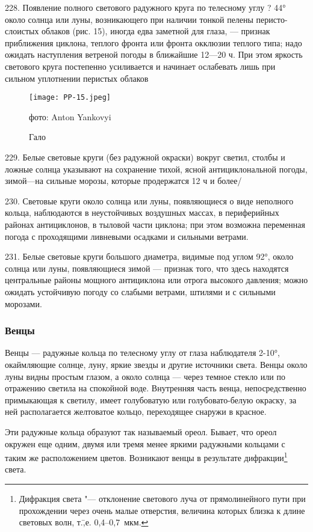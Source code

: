 228. Появление полного светового радужного круга по телесному углу ? 44° около солнца или луны, возникающего при наличии тонкой пелены перисто-слоистых облаков (рис. 15), иногда едва заметной для глаза, — признак приближения циклона, теплого фронта или фронта окклюзии теплого типа; надо ожидать наступления ветреной погоды в ближайшие 12—20 ч. При этом яркость светового круга постепенно усиливается и начинает ослабевать лишь при сильном уплотнении перистых облаков

\begin{figure}[htb]
  \centering{}
  \texttt{[image: PP-15.jpeg]}
  \caption{Гало}
  \label{fig:pp15}
  \small
  \centering{}фото: Anton Yankovyi
\end{figure}

229. Белые световые круги (без радужной окраски) вокруг светил, столбы и ложные солнца указывают на сохранение тихой, ясной антициклональной погоды, зимой—на сильные морозы, которые продержатся 12 ч и более/

230. Световые круги около солнца или луны, появляющиеся о виде неполного кольца, наблюдаются в неустойчивых воздушных массах, в периферийных районах антициклонов, в тыловой части циклона; при этом возможна переменная погода с проходящими ливневыми осадками и сильными ветрами.

231. Белые световые круги большого диаметра, видимые под углом 92°, около солнца или луны, появляющиеся зимой — признак того, что здесь находятся центральные районы мощного антициклона или отрога высокого давления; можно ожидать устойчивую погоду со слабыми ветрами, штилями и с сильными морозами.

\subsubsection{Венцы}

Венцы — радужные кольца по телесному углу от глаза наблюдателя 2-10°, окаймляющие солнце, луну, яркие звезды и другие источники света. Венцы около луны видны простым глазом, а около солнца — через темное стекло или по отражению светила на спокойной воде. Внутренняя часть венца, непосредственно примыкающая к светилу, имеет голубоватую или голубовато-белую окраску, за ней располагается желтоватое кольцо, переходящее снаружи в красное.

Эти радужные кольца образуют так называемый ореол. Бывает, что ореол окружен еще одним, двумя или тремя менее яркими радужными кольцами с таким же расположением цветов. Возникают венцы в результате дифракции\footnote{Дифракция света "--- отклонение светового луча от прямолинейного пути при прохождении через очень малые отверстия, величина которых близка к длине световых волн, т.\=,е. 0,4--0,7~мкм.} света.

